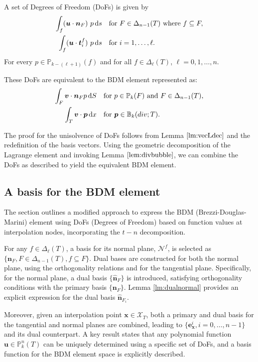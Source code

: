 \documentclass[12pt, a4paper]{article}
\newcommand{\dx}{\,{\rm d}x}
\newcommand{\dd}{\,{\rm d}}
\newcommand{\bs}{\boldsymbol}
\begin{document}
A set of Degrees of Freedom (DoFs) is given by
\begin{align}
\int_f (\bs u\cdot \bs n_F)\ p \dd s &\quad \text{for } F\in \Delta_{n-1}(T) \text{ where } f\subseteq F, \\
\int_f (\bs u\cdot \bs t_i^f)\ p \dd s &\quad \text{for } i=1,\ldots, \ell.
\end{align}
For every \(p \in \mathbb P_{k - (\ell +1)} (f)\) and for all \(f \in \Delta_{\ell}(T)\), \(\ell = 0,1,\ldots, n\).

These DoFs are equivalent to the BDM element represented as:
\begin{align}
\int_F \bs v\cdot \bs n_F p \dd S &\quad \text{for } p\in \mathbb P_k(F) \text{ and } F\in \Delta_{n-1}(T), \\
\int_T \bs v \cdot \bs p \dx &\quad \text{for } \bs p\in \mathbb B_k(div; T).
\end{align}

The proof for the unisolvence of DoFs follows from Lemma \(\ref{lm:vecLdec}\)
and the redefinition of the basis vectors. Using the geometric decomposition of
the Lagrange element and invoking Lemma \(\ref{lem:divbubble}\), we can combine
the DoFs as described to yield the equivalent BDM element.

\subsection{A basis for the BDM element}
The section outlines a modified approach to express the BDM
(Brezzi-Douglas-Marini) element using DoFs (Degrees of Freedom) based on
function values at interpolation nodes, incorporating the $t-n$ decomposition.

For any $f \in \Delta_{\ell}(T)$, a basis for its normal plane, $\mathcal N^f$,
is selected as $\{\boldsymbol{n}_F, F \in \Delta_{n-1}(T), f \subseteq F\}$.
Dual bases are constructed for both the normal plane, using the orthogonality
relations and for the tangential plane. Specifically, for the normal plane, a
dual basis $\{\hat{\boldsymbol{n}}_F\}$ is introduced, satisfying orthogonality
conditions with the primary basis $\{\boldsymbol{n}_F\}$. Lemma
\ref{lm:dualnormal} provides an explicit expression for the dual basis
$\hat{\boldsymbol{n}}_{F_i}$.

Moreover, given an interpolation point $\boldsymbol{x} \in \mathcal X_T$, both a
primary and dual basis for the tangential and normal planes are combined,
leading to $\{\boldsymbol{e}^i_{\boldsymbol{x}}, i=0, \ldots, n-1\}$ and its
dual counterpart. A key result states that any polynomial function
$\boldsymbol{u} \in \mathbb P_k^n(T)$ can be uniquely determined using a
specific set of DoFs, and a basis function for the BDM element space is
explicitly described.
\end{document}
